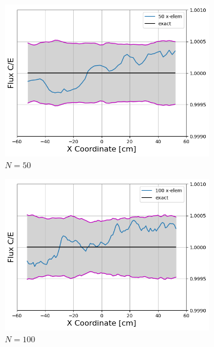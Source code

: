 \documentclass[letterpaper]{mc2023}
\begin{document}
\begin{figure}[H]
    \centering
    \begin{subfigure}{0.405\textwidth}
        \includegraphics[width=\linewidth]{figures/50_flux_CE_error_bars.png}
        \caption{$N=50$}
        \label{fig:s1}
    \end{subfigure}
    \begin{subfigure}{0.405\textwidth}
        \includegraphics[width=\linewidth]{figures/100_flux_CE_error_bars.png}
        \caption{$N=100$}
        \label{fig:s2}
    \end{subfigure}
    \par\bigskip
    \begin{subfigure}{0.405\textwidth}

\end{subfigure}
\end{figure}
\end{document}
